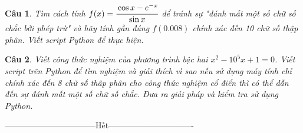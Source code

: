 \documentclass[11pt]{article}
\newtheorem{bt}{Câu}
\begin{document}
\begin{bt}
Tìm cách tính $f(x)=\cfrac{\cos x-e^{-x}}{\sin x}$ để tránh sự "đánh mất một số chữ số chắc bởi phép trừ" và hãy tính gần đúng $f(0.008)$ chính xác đến 10 chữ số thập phân. Viết script Python để thực hiện.
\end{bt}

\begin{bt}
Viết công thức nghiệm của phương trình bậc hai $x^2-10^5x+1=0$. Viết script trên Python để tìm nghiệm và giải thích vì sao nếu sử dụng máy tính chỉ chính xác đến 8 chữ số thâp phân cho công thức nghiệm cổ điển thì có thể dẫn đến sự đánh mất một số chữ số chắc. Đưa ra giải pháp và kiểm tra sử dụng Python.
\end{bt}

\centerline{———————————Hết——————————-}

% 
   
\end{document}
